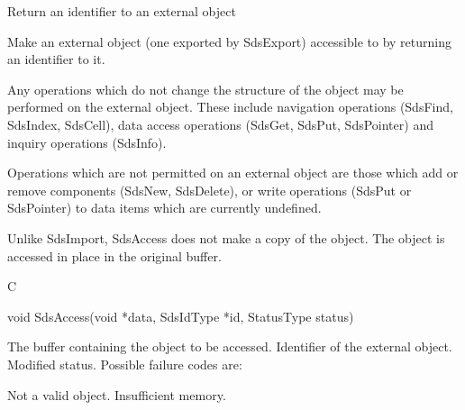 \begin{manroutinedescription}
      Return an identifier to an external object

      Make an external object (one exported by SdsExport) accessible
      to {} by returning an identifier to it.

      Any {} operations which do not change the structure of the %
object
      may be performed on the external object. These include navigation
      operations (SdsFind, SdsIndex, SdsCell), data access operations
      (SdsGet, SdsPut, SdsPointer) and inquiry operations (SdsInfo).

      Operations which are not permitted on an external object are those
      which add or remove components (SdsNew, SdsDelete), or write
      operations (SdsPut or SdsPointer) to data items which are currently
      undefined.

      Unlike SdsImport, SdsAccess does not make a copy of the object. The
      object is accessed in place in the original buffer.

      C

      void SdsAccess(void *data, SdsIdType *id, StatusType {\mantt{*}} {} status)
 
\begin{manparametertable}
 The buffer containing the object %
to be
                          accessed.
  Identifier of the external object.
 Modified status. Possible %
failure codes are:
\end{manparametertable}
\begin{mantwocolumntable}
Not a valid {} object.
Insufficient memory.
\end{mantwocolumntable}
\end{manroutinedescription}
